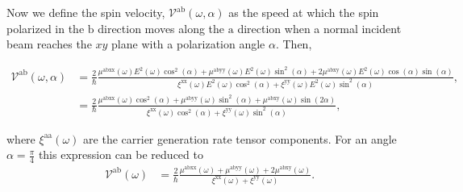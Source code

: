 \documentclass[prb,11pt,tightenlines,twocolumn,aps]{revtex4-1}
\begin{document}
Now we define the spin velocity, $\mathcal{V}^{\mathrm{ab}}(\omega,\alpha)$ as
the speed at which the spin polarized in the $\mathrm{b}$   direction moves
along the $\mathrm{a}$ direction when a normal incident beam reaches the $xy$
plane with a polarization angle $\alpha$. Then,
\begin{widetext}
\begin{align}
\mathcal{V}^{\mathrm{ab}}(\omega,\alpha)
&= \frac{2}{\hbar}
\frac{\mu^{\mathrm{abxx}}(\omega)
E^{2}(\omega)\cos^{2}(\alpha) + 
\mu^{\mathrm{abyy}}(\omega)
E^{2}(\omega)\sin^{2}(\alpha) + 
2\mu^{\mathrm{abxy}}(\omega)
E^{2}(\omega)\cos(\alpha)\sin(\alpha)}
{\xi^{\mathrm{xx}}(\omega)
E^{2}(\omega)\cos^{2}(\alpha) + 
\xi^{\mathrm{yy}}(\omega)
E^{2}(\omega)\sin^{2}(\alpha)},
\nonumber \\
&= \frac{2}{\hbar}
\frac{\mu^{\mathrm{abxx}}(\omega)\cos^{2}(\alpha) + 
\mu^{\mathrm{abyy}}(\omega)\sin^{2}(\alpha) + 
\mu^{\mathrm{abxy}}(\omega)\sin(2\alpha)}
{\xi^{\mathrm{xx}}(\omega)\cos^{2}(\alpha) + 
\xi^{\mathrm{yy}}(\omega)\sin^{2}(\alpha)},
\label{eq:vab}
\end{align}
\end{widetext}
where $\xi^{\mathrm{aa}}(\omega)$ are the carrier generation rate tensor
components\cite{arzatePRB14}.
% 
For an angle $\alpha = \frac{\pi}{4}$ this expression can be reduced to 
\begin{align}
\mathcal{V}^{\mathrm{ab}} (\omega)
&= \frac{2}{\hbar}
\frac{\mu^{\mathrm{abxx}}(\omega) + \mu^{\mathrm{abyy}}(\omega) + 
2\mu^{\mathrm{abxy}}(\omega)}
{\xi^{\mathrm{xx}}(\omega) + \xi^{\mathrm{yy}}(\omega)}.
\label{eq:vab-90deg}
\end{align}


\end{document}
